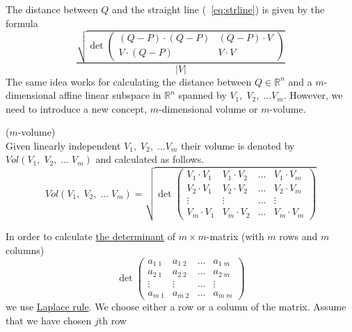 \documentclass[color=black,11pt]{elegantpaper}
\begin{document}
The distance between $Q$ and the straight line (~\ref{eq:strline}) is given by the formula
$$
\frac{\sqrt{\det \left(\begin{array}{cc}
                           (Q-P) \cdot (Q-P) & (Q-P) \cdot V\\
                            V \cdot (Q-P)  & V\cdot V 
                       \end{array}  \right)}}{|V|}
$$
The same idea works for calculating the distance between  $Q \in \mathbb{R}^n$ and a $m$-dimensional affine linear subspace in $\mathbb{R}^n$ spanned by $V_1,\;V_2,\; \dots V_m.$ However, we need to introduce a new concept, $m$-dimensional volume or $m$-volume.
\begin{definition}
\label{def:mvolume}
($m$-volume)\\
Given linearly independent  $V_1,\;V_2,\; \dots  V_m$ their volume is denoted by $Vol (V_1,\;V_2,\;\dots \;V_m)$ and calculated as follows.
\begin{equation}
\label{mvolume}
Vol (V_1,\;V_2,\;\dots \;V_m) = \sqrt{\det \left(\begin{array}{cccc}
                                                    V_1\cdot V_1 & V_1\cdot V_2& \dots & V_1 \cdot V_m\\
                                                    V_2\cdot V_1 & V_2\cdot V_2& \dots & V_2 \cdot V_m\\
                                                        \vdots &\vdots &\dots &\vdots \\
                                                    V_m\cdot V_1 & V_m\cdot V_2& \dots & V_m \cdot V_m
                                                   \end{array}  \right) }
\end{equation}
\end{definition}
In order to calculate \href{https://en.wikipedia.org/wiki/Determinant}{the determinant} of $m\times m$-matrix (with $m$ rows and $m$ columns) 
$$
\det \left(\begin{array}{cccc}
                 a_{1\; 1} & a_{1\; 2} & \dots & a_{1\; m}\\
                 a_{2\; 1} & a_{2\; 2} & \dots & a_{2\; m}\\
                   \vdots & \vdots & \dots &\vdots \\
                 a_{m\; 1} & a_{m\; 2} & \dots & a_{m\; m}
           \end{array}  \right)
$$
we use \href{https://en.wikipedia.org/wiki/Laplace_expansion}{Laplace rule}. We choose either a row or a column of the matrix. Assume that we have chosen  $j$th row
\end{document}
